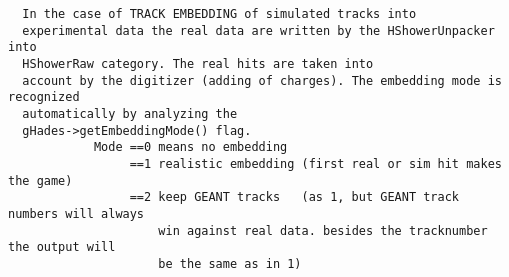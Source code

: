 \begin{lstlisting}
  In the case of TRACK EMBEDDING of simulated tracks into
  experimental data the real data are written by the HShowerUnpacker into
  HShowerRaw category. The real hits are taken into
  account by the digitizer (adding of charges). The embedding mode is recognized
  automatically by analyzing the
  gHades->getEmbeddingMode() flag.
            Mode ==0 means no embedding
                 ==1 realistic embedding (first real or sim hit makes the game)
                 ==2 keep GEANT tracks   (as 1, but GEANT track numbers will always
                     win against real data. besides the tracknumber the output will
                     be the same as in 1)

\end{lstlisting}


